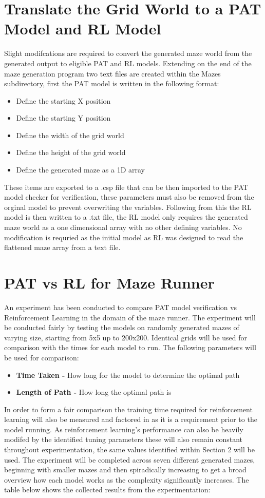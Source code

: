 \documentclass[twoside, 12pt, a4paper]{article}
\begin{document}
\section{Translate the Grid World to a PAT Model and RL Model}
Slight modifcations are required to convert the generated maze world from the generated output to eligible PAT and RL models. Extending on the end of the maze generation program two text files are created within the Mazes subdirectory, first the PAT model is written in the following format:
\begin{itemize}
 \item Define the starting X position
 \item Define the starting Y position
 \item Define the width of the grid world
 \item Define the height of the grid world
 \item Define the generated maze as a 1D array
\end{itemize}
These items are exported to a .csp file that can be then imported to the PAT model checker for verification, these parameters must also be removed from the orginal model to prevent overwriting the variables. Following from this the RL model is then written to a .txt file, the RL model only requires the generated maze world as a one dimensional array with no other defining variables. No modification is requried as the initial model as RL was designed to read the flattened maze array from a text file.

\section{PAT vs RL for Maze Runner}
An experiment has been conducted to compare PAT model verification vs Reinforcement Learning in the domain of the maze runner. The experiment will be conducted fairly by testing the models on randomly generated mazes of varying size, starting from 5x5 up to 200x200. Identical grids will be used for comparison with the times for each model to run. The following parameters will be used for comparison:
\begin {itemize}
\item \textbf{Time Taken -} How long for the model to determine the optimal path
\item \textbf{Length of Path -} How long the optimal path is
\end {itemize}
In order to form a fair comparison the training time required for reinforcement learning will also be measured and factored in as it is a requirement prior to the model running. As reinforcement learning's performance can also be heavily modifed by the identified tuning parameters these will also remain constant throughout experimentation, the same values identified within Section 2 will be used.  The experiment will be completed across seven different generated mazes, beginning with smaller mazes and then spiradically increasing to get a broad overview how each model works as the complexity significantly increases. The table below shows the collected results from the experimentation:
\end{document}
